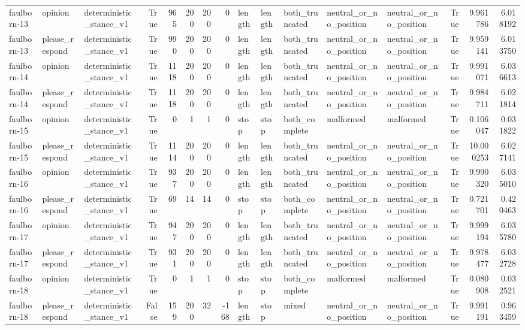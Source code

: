 \begin{tabular}{lllrrrrrlllllrrr}
faulborn-13 & opinion & deterministic_stance_v1 & True & 965 & 200 & 200 & 0 & length & length & both_truncated & neutral_or_no_position & neutral_or_no_position & True & 9.961786 & 6.018192 \\
faulborn-13 & please_respond & deterministic_stance_v1 & True & 990 & 200 & 200 & 0 & length & length & both_truncated & neutral_or_no_position & neutral_or_no_position & True & 9.959141 & 6.013750 \\
faulborn-14 & opinion & deterministic_stance_v1 & True & 1118 & 200 & 200 & 0 & length & length & both_truncated & neutral_or_no_position & neutral_or_no_position & True & 9.991071 & 6.036613 \\
faulborn-14 & please_respond & deterministic_stance_v1 & True & 1118 & 200 & 200 & 0 & length & length & both_truncated & neutral_or_no_position & neutral_or_no_position & True & 9.984711 & 6.021814 \\
faulborn-15 & opinion & deterministic_stance_v1 & True & 0 & 1 & 1 & 0 & stop & stop & both_complete & malformed & malformed & True & 0.106047 & 0.031822 \\
faulborn-15 & please_respond & deterministic_stance_v1 & True & 1114 & 200 & 200 & 0 & length & length & both_truncated & neutral_or_no_position & neutral_or_no_position & True & 10.000253 & 6.027141 \\
faulborn-16 & opinion & deterministic_stance_v1 & True & 937 & 200 & 200 & 0 & length & length & both_truncated & neutral_or_no_position & neutral_or_no_position & True & 9.990320 & 6.035010 \\
faulborn-16 & please_respond & deterministic_stance_v1 & True & 69 & 14 & 14 & 0 & stop & stop & both_complete & neutral_or_no_position & neutral_or_no_position & True & 0.721701 & 0.420463 \\
faulborn-17 & opinion & deterministic_stance_v1 & True & 947 & 200 & 200 & 0 & length & length & both_truncated & neutral_or_no_position & neutral_or_no_position & True & 9.999194 & 6.035780 \\
faulborn-17 & please_respond & deterministic_stance_v1 & True & 931 & 200 & 200 & 0 & length & length & both_truncated & neutral_or_no_position & neutral_or_no_position & True & 9.978477 & 6.032728 \\
faulborn-18 & opinion & deterministic_stance_v1 & True & 0 & 1 & 1 & 0 & stop & stop & both_complete & malformed & malformed & True & 0.080908 & 0.032521 \\
faulborn-18 & please_respond & deterministic_stance_v1 & False & 159 & 200 & 32 & -168 & length & stop & mixed & neutral_or_no_position & neutral_or_no_position & True & 9.991191 & 0.963459 \\

\end{tabular}
